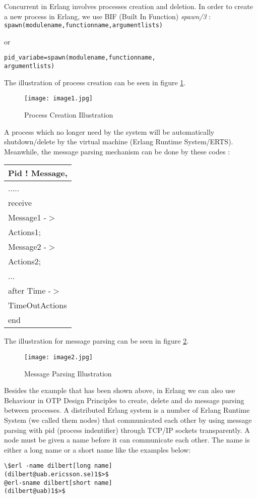 \documentclass[final,
notitlepage,
narroweqnarray,
    inline,
    twoside,
]{ieee}
\begin{document}
Concurrent in Erlang involves processes creation and deletion. In
order to create a new process in Erlang, we use BIF (Built In
Function) \textit{spawn/3} :
\texttt{spawn(modulename,functionname,argumentlists)}

or

\noindent
\texttt{pid\_variabe=spawn(modulename,functionname,\\
argumentlists)}

The illustration of process creation can be seen in figure
\ref{image1}.

\begin{figure}[htbp]
\texttt{[image: image1.jpg]}
\caption{Process Creation Illustration}
\label{image1}
\end{figure}


A process which no longer need by the system will be automatically
shutdown/delete by the virtual machine (Erlang Runtime
System/ERTS). Meanwhile, the message parsing mechanism can be done
by these codes :

\begin{tabular}{|p{1.2in}|} \hline
Pid ! Message, \\ \hline
..... \\ \hline
receive \\ \hline
Message1 -$>$ \\ \hline
Actions1; \\ \hline
Message2 -$>$ \\ \hline
Actions2; \\ \hline
... \\ \hline
after Time -$>$ \\ \hline
TimeOutActions \\ \hline
end \\ \hline
\end{tabular}

The illustration for message parsing can be seen in figure
\ref{image2}.

\begin{figure}[htbp]
\texttt{[image: image2.jpg]}
\caption{Message Parsing Illustration}
\label{image2}
\end{figure}

Besides the example that has been shown above, in Erlang we can
also use Behaviour in OTP Design Principles to create, delete and
do message parsing between processes. A distributed Erlang system
is a number of Erlang Runtime System (we called them nodes) that
communicated each other by using message parsing with pid (process
indentifier) through TCP/IP sockets transparently. A node must be
given a name before it can communicate each other. The name is
either a long name or a short name like the examples below:
\begin{verbatim}
\$erl -name dilbert[long name]
(dilbert@uab.ericsson.se)1$>$
@erl-sname dilbert[short name]
(dilbert@uab)1$>$
\end{verbatim}
\end{document}
